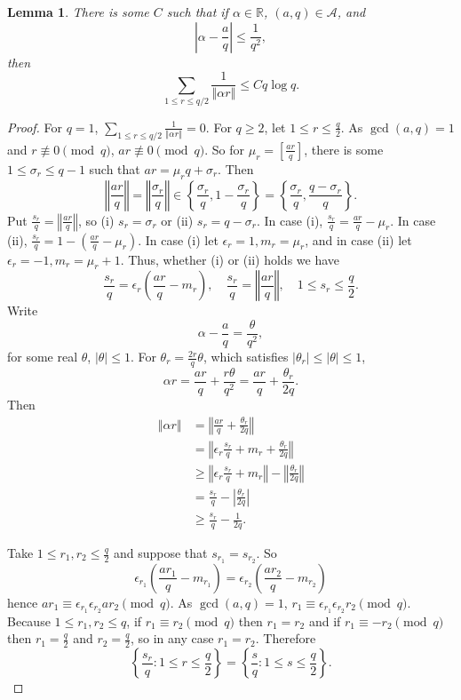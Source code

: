 \documentclass{amsart}
\newcommand{\norm}[1]{\left\Vert #1 \right\Vert}
\newtheorem{lemma}[theorem]{Lemma}
\begin{document}
\begin{lemma}
There is some $C$ such that if $\alpha \in \mathbb{R}$, $(a,q) \in \mathscr{A}$, and
\[
\left|\alpha - \frac{a}{q} \right| \leq \frac{1}{q^2},
\]
then
\[
\sum_{1 \leq r \leq q/2} \frac{1}{\norm{\alpha r}} \leq C q\log q.
\]
\label{lemma48}
\end{lemma}
\begin{proof}
For $q=1$, $\sum_{1 \leq r \leq q/2} \frac{1}{\norm{\alpha r}}=0$. For $q \geq 2$, let
$1 \leq r \leq \frac{q}{2}$. 
As $\gcd(a,q)=1$ and $r \not \equiv 0 \pmod{q}$, $ar \not \equiv 0 \pmod{q}$. So for $\mu_r = \left[ \frac{ar}{q} \right]$, there is some
$1 \leq \sigma_r \leq q-1$ such that $ar=\mu_r q + \sigma_r$. Then
\[
\norm{\frac{ar}{q}} = \norm{\frac{\sigma_r}{q}} \in \left\{ \frac{\sigma_r}{q},1-\frac{\sigma_r}{q}\right\}
=\left\{\frac{\sigma_r}{q},\frac{q-\sigma_r}{q}\right\}.
\]
Put $\frac{s_r}{q} =  \norm{\frac{ar}{q}}$, so (i) $s_r = \sigma_r$ or (ii) $s_r = q-\sigma_r$.
In case (i), $\frac{s_r}{q} = \frac{ar}{q}-\mu_r$.
In case (ii), $\frac{s_r}{q} = 1-\left( \frac{ar}{q} - \mu_r \right)$.
In case (i) let $\epsilon_r = 1, m_r=\mu_r$, and in case (ii) let $\epsilon_r=-1,
m_r = \mu_r+1$. Thus, whether (i) or (ii) holds we have
\[
\frac{s_r}{q} = \epsilon_r \left(\frac{ar}{q}-m_r\right),\quad \frac{s_r}{q} = \norm{\frac{ar}{q}}, \quad 1 \leq s_r \leq \frac{q}{2}.
\]
Write 
\[
\alpha - \frac{a}{q} = \frac{\theta}{q^2},
\]
for some real $\theta$, $|\theta| \leq 1$. For $\theta_r = \frac{2r}{q} \theta$, which satisfies
$|\theta_r| \leq |\theta| \leq 1$,
\[
\alpha r = \frac{ar}{q} + \frac{r\theta}{q^2} = \frac{ar}{q} + \frac{\theta_r}{2q}.
\]
Then
\begin{align*}
\norm{\alpha r}&=\norm{\frac{ar}{q}+\frac{\theta_r}{2q}}\\
&=\norm{\epsilon_r \frac{s_r}{q} + m_r + \frac{\theta_r}{2q}}\\
&\geq \norm{\epsilon_r \frac{s_r}{q} + m_r} - \norm{\frac{\theta_r}{2q}}\\
&=\frac{s_r}{q} - \left|\frac{\theta_r}{2q}\right|\\
&\geq \frac{s_r}{q} - \frac{1}{2q}.
\end{align*}

Take $1 \leq r_1, r_2 \leq \frac{q}{2}$ and suppose that $s_{r_1}=s_{r_2}$. So 
\[
 \epsilon_{r_1} \left(\frac{ar_1}{q}-m_{r_1}\right) =  \epsilon_{r_2} \left(\frac{ar_2}{q}-m_{r_2}\right)
\]
hence $ar_1 \equiv \epsilon_{r_1} \epsilon_{r_2} ar_2 \pmod{q}$.  As
$\gcd(a,q)=1$, $r_1 \equiv \epsilon_{r_1} \epsilon_{r_2} r_2 \pmod{q}$. 
Because $1 \leq r_1, r_2 \leq q$, 
if $r_1 \equiv r_2 \pmod{q}$ then $r_1=r_2$ and if $r_1 \equiv -r_2 \pmod{q}$ then $r_1 = \frac{q}{2}$
and $r_2=\frac{q}{2}$, so in any case $r_1=r_2$. 
Therefore
\[
\left\{ \frac{s_r}{q} : 1 \leq r \leq \frac{q}{2} \right\}
=\left\{\frac{s}{q} : 1 \leq s \leq \frac{q}{2} \right\}.
\]


\end{proof}
\end{document}
